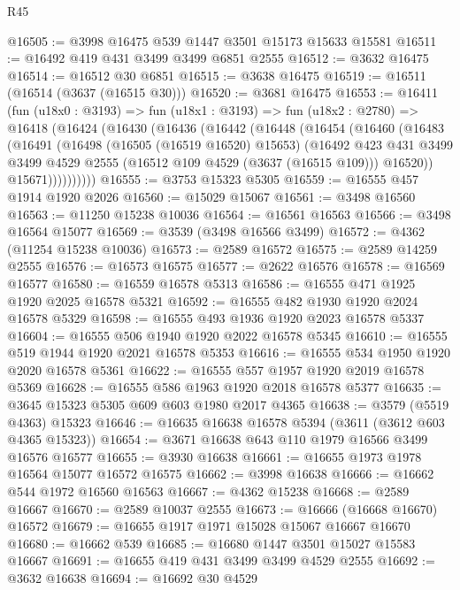 \begin{lexlean}{R45}
\begin{coremodule}
@16505 := @3998 @16475 @539 @1447 @3501 @15173 @15633 @15581
@16511 := @16492 @419 @431 @3499 @3499 @6851 @2555
@16512 := @3632 @16475
@16514 := @16512 @30 @6851
@16515 := @3638 @16475
@16519 := @16511 (@16514 (@3637 (@16515 @30)))
@16520 := @3681 @16475
@16553 := @16411
    (fun (u18x0 : @3193) =>
    fun (u18x1 : @3193) =>
    fun (u18x2 : @2780) =>
    @16418
      (@16424
        (@16430
          (@16436
            (@16442
              (@16448
                (@16454
                  (@16460
                    (@16483
                      (@16491
                        (@16498
                          (@16505 (@16519 @16520) @15653)
                          (@16492
                            @423
                            @431
                            @3499
                            @3499
                            @4529
                            @2555
                            (@16512 @109 @4529 (@3637 (@16515 @109)))
                            @16520))
                        @15671))))))))))
@16555 := @3753 @15323 @5305
@16559 := @16555 @457 @1914 @1920 @2026
@16560 := @15029 @15067
@16561 := @3498 @16560
@16563 := @11250 @15238 @10036
@16564 := @16561 @16563
@16566 := @3498 @16564 @15077
@16569 := @3539 (@3498 @16566 @3499)
@16572 := @4362 (@11254 @15238 @10036)
@16573 := @2589 @16572
@16575 := @2589 @14259 @2555
@16576 := @16573 @16575
@16577 := @2622 @16576
@16578 := @16569 @16577
@16580 := @16559 @16578 @5313
@16586 := @16555 @471 @1925 @1920 @2025 @16578 @5321
@16592 := @16555 @482 @1930 @1920 @2024 @16578 @5329
@16598 := @16555 @493 @1936 @1920 @2023 @16578 @5337
@16604 := @16555 @506 @1940 @1920 @2022 @16578 @5345
@16610 := @16555 @519 @1944 @1920 @2021 @16578 @5353
@16616 := @16555 @534 @1950 @1920 @2020 @16578 @5361
@16622 := @16555 @557 @1957 @1920 @2019 @16578 @5369
@16628 := @16555 @586 @1963 @1920 @2018 @16578 @5377
@16635 := @3645 @15323 @5305 @609 @603 @1980 @2017 @4365
@16638 := @3579 (@5519 @4363) @15323
@16646 := @16635 @16638 @16578 @5394 (@3611 (@3612 @603 @4365 @15323))
@16654 := @3671 @16638 @643 @110 @1979 @16566 @3499 @16576 @16577
@16655 := @3930 @16638
@16661 := @16655 @1973 @1978 @16564 @15077 @16572 @16575
@16662 := @3998 @16638
@16666 := @16662 @544 @1972 @16560 @16563
@16667 := @4362 @15238
@16668 := @2589 @16667
@16670 := @2589 @10037 @2555
@16673 := @16666 (@16668 @16670) @16572
@16679 := @16655 @1917 @1971 @15028 @15067 @16667 @16670
@16680 := @16662 @539
@16685 := @16680 @1447 @3501 @15027 @15583 @16667
@16691 := @16655 @419 @431 @3499 @3499 @4529 @2555
@16692 := @3632 @16638
@16694 := @16692 @30 @4529

\end{coremodule}
\end{lexlean}
